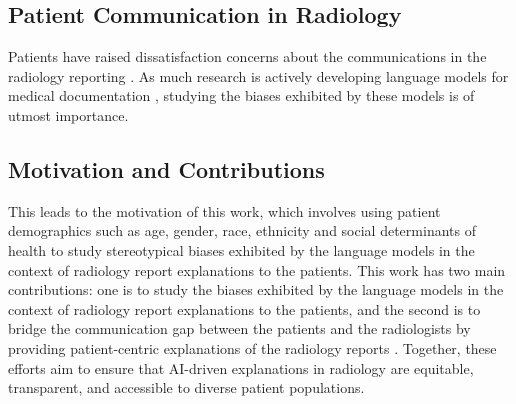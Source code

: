 \subsection{Patient Communication in Radiology}
\label{subsec:patient_communication}
Patients have raised dissatisfaction concerns about the communications in the radiology reporting \citep{mulisaPatientsSatisfactionRadiological2017,langUnderstandingPatientSatisfaction2013,ochonmaPatientsReactionEthical2015}.
As much research is actively developing language models for medical documentation \citep{parkPatientcenteredRadiologyReports2024,stephanImprovingPatientCommunication2025,butlerJargonClarityImproving2024,rustEvaluationLargeLanguage2025,burnsReadabilityPatientDischarge2022,thirunavukarasuLargeLanguageModels2023,singhalLargeLanguageModels2023,luHealthcareProfessionalsPublic2025}, studying the biases exhibited by these models is of utmost importance.
\subsection{Motivation and Contributions}
\label{subsec:motivation}
This leads to the motivation of this work, which involves using patient demographics such as age, gender, race, ethnicity and social determinants of health to study stereotypical biases exhibited by the language models in the context of radiology report explanations to the patients.
This work has two main contributions: one is to study the biases exhibited by the language models in the context of radiology report explanations to the patients, and the second is to bridge the communication gap between the patients and the radiologists by providing patient-centric explanations of the radiology reports \citep{vandenbergPatientComplaintsRadiology2019,siewertImpactCommunicationErrors2016,rockallPatientCommunicationRadiology2022,kasalakWorkOverloadDiagnostic2023,europeansocietyofradiologyesrPatientSurveyValue2021,vijanOptimizingPatientCommunication2023}.
Together, these efforts aim to ensure that AI-driven explanations in radiology are equitable, transparent, and accessible to diverse patient populations.